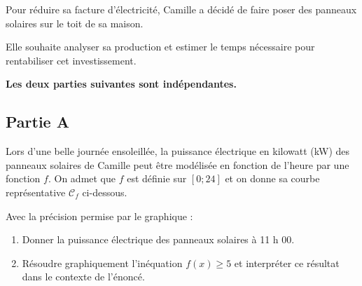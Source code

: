 Pour réduire sa facture d'électricité, Camille a décidé de faire poser des panneaux solaires sur le toit de sa maison.

Elle souhaite analyser sa production et estimer le temps nécessaire pour rentabiliser cet investissement.

\textbf{Les deux parties suivantes sont indépendantes.}

\subsection*{Partie A}

Lors d'une belle journée ensoleillée, la puissance électrique en kilowatt (kW) des panneaux solaires de Camille peut être modélisée en fonction de l'heure par une fonction $f$. On admet que $f$ est définie sur $[0 ; 24]$ et on donne sa courbe représentative $\mathcal{C}_{f}$ ci-dessous.

Avec la précision permise par le graphique :

\begin{center}
\end{center}















\begin{enumerate}
	\item Donner la puissance électrique des panneaux solaires à 11 h 00.

	\item Résoudre graphiquement l'inéquation \quad $f(x) \geqslant 5$ \quad et interpréter ce résultat dans le contexte de l'énoncé.
\end{enumerate}

